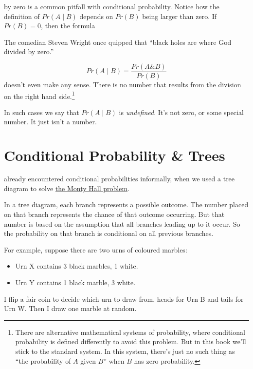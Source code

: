 \documentclass[justified]{tufte-book}
\providecommand{\tightlist}{%
  \setlength{\itemsep}{0pt}\setlength{\parskip}{0pt}}
\newcommand{\given}{\mid}
\renewcommand{\wedge}{\mathbin{\&}}
\newcommand{\p}{Pr}
\theoremstyle{definition}
\theoremstyle{definition}
\theoremstyle{definition}
\theoremstyle{remark}
\begin{document}
 by zero is a common pitfall with conditional probability. Notice how the definition of \(\p(A \given B)\) depends on \(\p(B)\) being larger than zero. If \(\p(B) = 0\), then the formula

\begin{marginfigure}
The comedian Steven Wright once quipped that ``black holes are where God
divided by zero.''
\end{marginfigure}

\[ \p(A \given B) = \frac{\p(A \wedge B)}{\p(B)} \]
doesn't even make any sense. There is no number that results from the division on the right hand side.\footnote{There are alternative mathematical systems of probability, where conditional probability is defined differently to avoid this problem. But in this book we'll stick to the standard system. In this system, there's just no such thing as ``the probability of \(A\) given \(B\)'' when \(B\) has zero probability.}

In such cases we say that \(\p(A \given B)\) is \emph{undefined}. It's not zero, or some special number. It just isn't a number.

\hypertarget{conditional-probability-trees}{%
\section{Conditional Probability \& Trees}\label{conditional-probability-trees}}

 already encountered conditional probabilities informally, when we used a tree diagram to solve \protect\hyperlink{the-monty-hall-problem}{the Monty Hall problem}.

In a tree diagram, each branch represents a possible outcome. The number placed on that branch represents the chance of that outcome occurring. But that number is based on the assumption that all branches leading up to it occur. So the probability on that branch is conditional on all previous branches.

For example, suppose there are two urns of coloured marbles:

\begin{itemize}
\tightlist
\item
  Urn X contains 3 black marbles, 1 white.
\item
  Urn Y contains 1 black marble, 3 white.
\end{itemize}

I flip a fair coin to decide which urn to draw from, heads for Urn B and tails for Urn W. Then I draw one marble at random.
\end{document}
